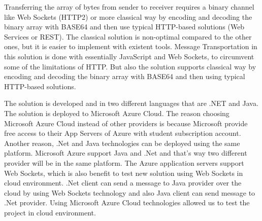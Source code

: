 \documentclass[runningheads,a4paper]{llncs}
\begin{document}
Transferring the array of bytes from sender to receiver requires a binary channel like Web Sockets (HTTP2) or more classical way by encoding and decoding the binary array with BASE64 and then use typical HTTP-based solutions (Web Services or REST). The classical solution is non-optimal compared to the other ones, but it is easier to implement with existent tools. Message Transportation in this solution is done with essentially JavaScript and Web Sockets, to circumvent some of the limitations of HTTP. But also the solution supports classical way by encoding and decoding the binary array with BASE64 and then using typical HTTP-based solutions.

The solution is developed and in two different languages that are .NET and Java. The solution is deployed to Microsoft Azure Cloud. The reason choosing Microsoft Azure Cloud instead of other providers is because Microsoft provide free access to their App Servers of Azure with student subscription account. Another reason, .Net and Java technologies can be deployed using the same platform. Microsoft Azure support Java and .Net and that’s way two different provider will be in the same platform. The Azure application servers support Web Sockets, which is also benefit to test new solution using Web Sockets in cloud environment. .Net client can send a message to Java provider over the cloud by using Web Sockets technology and also Java client can send message to .Net provider. Using Microsoft Azure Cloud technologies allowed us to test the project in cloud environment.
\end{document}
